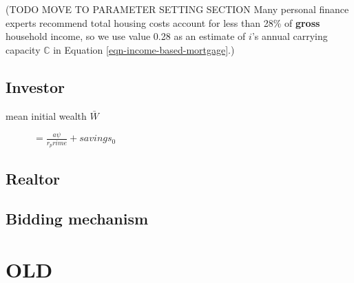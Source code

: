 (TODO MOVE TO PARAMETER SETTING SECTION Many personal finance experts recommend total housing costs account for less than  28\% of \textbf{gross} household income, so we use value 0.28 as an estimate of $i$'s annual carrying capacity  $\mathbb{C}$ in Equation \ref{eqn-income-based-mortgage}.)



\subsection{Investor}
\begin{description}
\item[mean initial wealth $\bar W$] $= \frac {a\psi}{r_prime}+savings_0$
\end{description}

\subsection{Realtor}

\subsection{Bidding mechanism}

\section{OLD}


